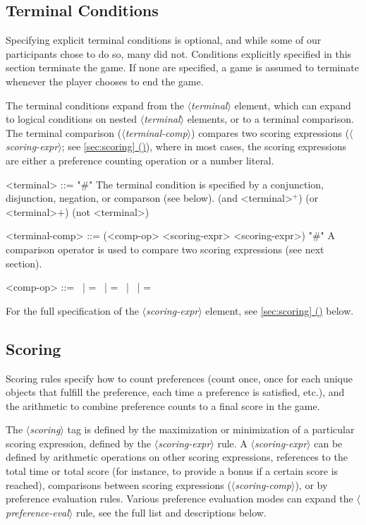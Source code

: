 \documentclass{article}
\newcommand{\dsl}[1]{{\it $\langle$#1$\rangle$}}
\newcommand*{\fullref}[1]{\hyperref[{#1}]{\autoref*{#1} (\nameref*{#1})}} %
\begin{document}
\subsection{Terminal Conditions} \label{sec:terminal}
Specifying explicit terminal conditions is optional, and while some of our participants chose to do so, many did not. 
Conditions explicitly specified in this section terminate the game.
If none are specified, a game is assumed to terminate whenever the player chooses to end the game. 

The terminal conditions expand from the \dsl{terminal} element, which can expand to logical conditions on nested \dsl{terminal} elements, or to a terminal comparison. 
The terminal comparison (\dsl{terminal-comp}) compares two scoring expressions (\dsl{scoring-expr}; see \fullref{sec:scoring}), where in most cases, the scoring expressions are either a preference counting operation or a number literal. 
        
\begin{grammar}
<terminal> ::= "#" The terminal condition is specified by a conjunction, disjunction, negation, or comparson (see below).
        \alt (and <terminal>$^+$)
        \alt (or <terminal>$+$)
        \alt (not <terminal>) 

<terminal-comp> ::= (<comp-op> <scoring-expr> <scoring-expr>) "#" A comparison operator is used to compare two scoring expressions (see next section).

    <comp-op> ::=  \textlangle \ | \textlangle = \ | = \ | \textrangle \ | \textrangle =



\end{grammar}
For the full specification of the \dsl{scoring-expr} element, see \fullref{sec:scoring} below.
        


\subsection{Scoring} \label{sec:scoring}
Scoring rules specify how to count preferences (count once, once for each unique objects that fulfill the preference, each time a preference is satisfied, etc.), and the arithmetic to combine preference counts to a final score in the game.

The \dsl{scoring} tag is defined by the maximization or minimization of a particular scoring expression, defined by the \dsl{scoring-expr} rule.
A \dsl{scoring-expr} can be defined by arithmetic operations on other scoring expressions, references to the total time or total score (for instance, to provide a bonus if a certain score is reached), comparisons between scoring expressions (\dsl{scoring-comp}), or by preference evaluation rules.
Various preference evaluation modes can expand the \dsl{preference-eval} rule, see the full list and descriptions below.
        
\end{document}
